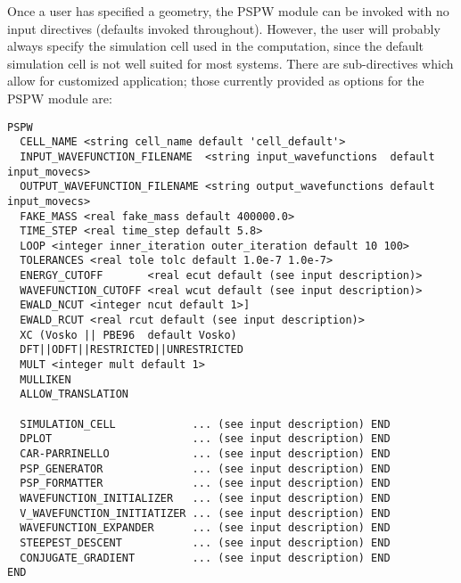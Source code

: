 Once a user has specified a geometry, the PSPW module can be invoked
with no input  directives (defaults invoked throughout).  However, the
user will probably always specify the  simulation cell used in the
computation, since the default simulation cell is not well suited for
most systems.  There are sub-directives which allow for customized
application; those currently provided as options for the PSPW module are:
\begin{verbatim}
PSPW
  CELL_NAME <string cell_name default 'cell_default'>
  INPUT_WAVEFUNCTION_FILENAME  <string input_wavefunctions  default input_movecs>
  OUTPUT_WAVEFUNCTION_FILENAME <string output_wavefunctions default input_movecs>
  FAKE_MASS <real fake_mass default 400000.0>
  TIME_STEP <real time_step default 5.8>
  LOOP <integer inner_iteration outer_iteration default 10 100>
  TOLERANCES <real tole tolc default 1.0e-7 1.0e-7>
  ENERGY_CUTOFF       <real ecut default (see input description)>
  WAVEFUNCTION_CUTOFF <real wcut default (see input description)>
  EWALD_NCUT <integer ncut default 1>]
  EWALD_RCUT <real rcut default (see input description)>
  XC (Vosko || PBE96  default Vosko)
  DFT||ODFT||RESTRICTED||UNRESTRICTED
  MULT <integer mult default 1>
  MULLIKEN
  ALLOW_TRANSLATION

  SIMULATION_CELL            ... (see input description) END
  DPLOT                      ... (see input description) END
  CAR-PARRINELLO             ... (see input description) END
  PSP_GENERATOR              ... (see input description) END
  PSP_FORMATTER              ... (see input description) END
  WAVEFUNCTION_INITIALIZER   ... (see input description) END
  V_WAVEFUNCTION_INITIATIZER ... (see input description) END
  WAVEFUNCTION_EXPANDER      ... (see input description) END
  STEEPEST_DESCENT           ... (see input description) END
  CONJUGATE_GRADIENT         ... (see input description) END
END 
\end{verbatim}

